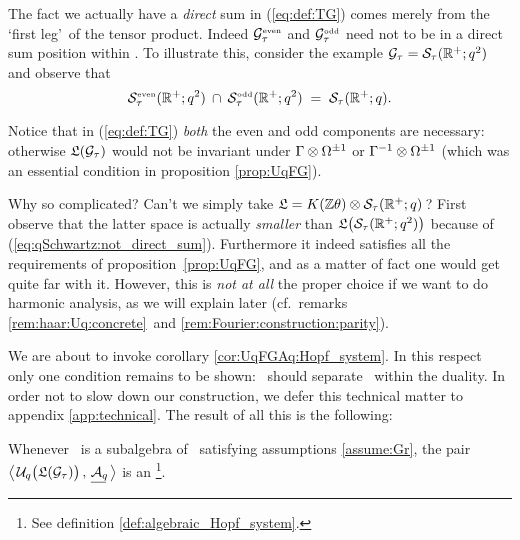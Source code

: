 \begin{remarks} \label{rem:parity} \rm
\item
The fact we actually have a {\em direct\/} sum in (\ref{eq:def:TG}) comes
merely from the \lq first leg\rq\ of the tensor product. Indeed
$\mathcal G_\tau^{\rm \scriptscriptstyle even}$ and $\mathcal G_\tau^{\rm \scriptscriptstyle odd}$ need not to be in a direct sum position within \HC\@.
To illustrate this, consider the example
$\mathcal G_\tau={\mathcal S}_\tau (\mathbb{R}^+;q^2)$ and observe that
\begin{equation}\label{eq:qSchwartz:not_direct_sum}
    {\mathcal S}_\tau^{\rm \scriptscriptstyle even} (\mathbb{R}^+;q^2) \:\cap\:
    {\mathcal S}_\tau^{\rm \scriptscriptstyle odd}  (\mathbb{R}^+;q^2)  \;=\;
    {\mathcal S}_\tau (\mathbb{R}^+;q).
\end{equation}
\item
Notice that in (\ref{eq:def:TG}) {\em both\/} the even and odd components
are necessary: otherwise $\mathfrak{L}(\mathcal G_\tau)$ would not be invariant under
$\Gamma \otimes \Omega^{\pm 1}$ or $\Gamma^{-1} \otimes \Omega^{\pm 1}$
(which was an essential condition in proposition \ref{prop:UqFG}).
\item
Why so complicated? Can't we simply take
${\mathfrak{L}} = K(\mathbb{Z} \theta) \otimes {\mathcal S}_\tau (\mathbb{R}^+;q)\,$?
First observe that the latter space is actually {\em smaller\/} than
$\calL\!\left(\vertM {\mathcal S}_\tau (\RR^+;q^2) \right)$
because of (\ref{eq:qSchwartz:not_direct_sum}).
Furthermore it indeed satisfies all the requirements of \mbox{proposition \ref{prop:UqFG}},
and as a matter of fact one would get quite far with it.
However, this is {\em not at all\/} the proper choice if we want
to do harmonic analysis, as we will explain later
(cf.\ remarks \ref{rem:haar:Uq:concrete}\ and \ref{rem:Fourier:construction:parity}).
\end{remarks}


We are about to invoke corollary \ref{cor:UqFGAq:Hopf_system}\@.
In this respect only one condition remains to be shown:
\UqTG\ should separate \Aq\ within the duality.
In order not to slow down our construction, we defer this technical matter to
appendix \ref{app:technical}\@.
The result of all this is the following:


\begin{prop} \label{prop:UqGT:Aq:summary}
 Whenever\/ \Gtau\ is a subalgebra of\/ \HC\ satisfying assumptions \ref{assume:Gr},
 the pair
 $\left\langle\vertM\right.\!   \UqTG, \, \underline{\Aq\!}  \left.\vertM\right\rangle$
 is an \ahss\footnote{See definition \ref{def:algebraic_Hopf_system}.}\@.
\end{prop}


